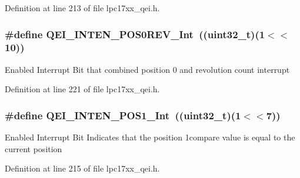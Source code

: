 \-Definition at line 213 of file lpc17xx\-\_\-qei.\-h.

\hypertarget{group___q_e_i___private___macros_ga5ce8c5f20c33f2b080d1f181fb98e362}{
\subsubsection[{\-Q\-E\-I\-\_\-\-I\-N\-T\-E\-N\-\_\-\-P\-O\-S0\-R\-E\-V\-\_\-\-Int}]{\setlength{\rightskip}{0pt plus 5cm}\#define {\bf \-Q\-E\-I\-\_\-\-I\-N\-T\-E\-N\-\_\-\-P\-O\-S0\-R\-E\-V\-\_\-\-Int}~((uint32\-\_\-t)(1$<$$<$10))}}\label{group___q_e_i___private___macros_ga5ce8c5f20c33f2b080d1f181fb98e362}
\-Enabled \-Interrupt \-Bit that combined position 0 and revolution count interrupt 

\-Definition at line 221 of file lpc17xx\-\_\-qei.\-h.

\hypertarget{group___q_e_i___private___macros_ga9d0fb7e8e1deba84b61762f0fae19e76}{
\subsubsection[{\-Q\-E\-I\-\_\-\-I\-N\-T\-E\-N\-\_\-\-P\-O\-S1\-\_\-\-Int}]{\setlength{\rightskip}{0pt plus 5cm}\#define {\bf \-Q\-E\-I\-\_\-\-I\-N\-T\-E\-N\-\_\-\-P\-O\-S1\-\_\-\-Int}~((uint32\-\_\-t)(1$<$$<$7))}}\label{group___q_e_i___private___macros_ga9d0fb7e8e1deba84b61762f0fae19e76}
\-Enabled \-Interrupt \-Bit \-Indicates that the position 1compare value is equal to the current position 

\-Definition at line 215 of file lpc17xx\-\_\-qei.\-h.

